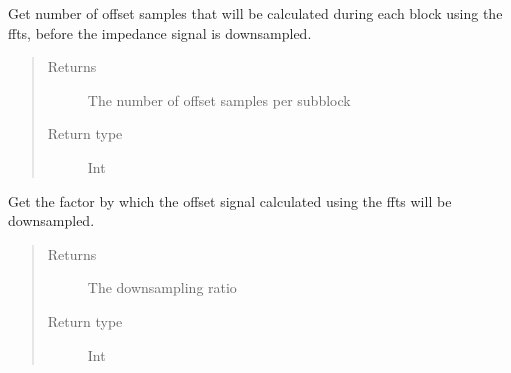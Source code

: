 \documentclass[letterpaper,10pt,english]{sphinxmanual}
\begin{document}
\begin{fulllineitems}
\begin{fulllineitems}
\label{\detokenize{index:TiePieLCR_settings.TiePieLCR_settings.get_offset_block_size}}
\sphinxAtStartPar
Get number of offset samples that will be calculated during each block using the ffts, before the impedance signal is downsampled.
\begin{quote}\begin{description}
\item[{Returns}] \leavevmode
\sphinxAtStartPar
The number of offset samples per sub\sphinxhyphen{}block

\item[{Return type}] \leavevmode
\sphinxAtStartPar
Int

\end{description}\end{quote}

\end{fulllineitems}


\begin{fulllineitems}
\label{\detokenize{index:TiePieLCR_settings.TiePieLCR_settings.get_offset_downsampling_rate}}
\sphinxAtStartPar
Get the factor by which the offset signal calculated using the ffts will be downsampled.
\begin{quote}\begin{description}
\item[{Returns}] \leavevmode
\sphinxAtStartPar
The downsampling ratio

\item[{Return type}] \leavevmode
\sphinxAtStartPar
Int

\end{description}\end{quote}

\end{fulllineitems}



\end{fulllineitems}
\end{document}
